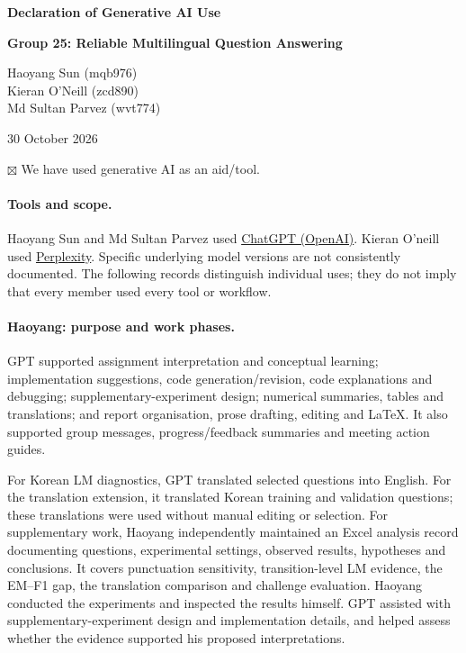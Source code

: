\documentclass[11pt,a4paper]{article}
\begin{document}
\begin{center}
    {\Large\bfseries Declaration of Generative AI Use}

    \vspace{8pt}
    {\bfseries Group 25: Reliable Multilingual Question Answering}

    \vspace{6pt}
    Haoyang Sun (mqb976)\\
    Kieran O'Neill (zcd890)\\
    Md Sultan Parvez (wvt774)

    \vspace{6pt}
    30 October 2026
\end{center}

\vspace{8pt}

$\boxtimes$ We have used generative AI as an aid/tool.

\paragraph{Tools and scope.}
Haoyang Sun and Md Sultan Parvez used
\href{https://chatgpt.com/}{ChatGPT (OpenAI)}.
Kieran O'neill used
\href{https://www.perplexity.ai/}{Perplexity}.
Specific underlying model versions are not consistently documented.
The following records distinguish individual uses; they do not imply
that every member used every tool or workflow.

\paragraph{Haoyang: purpose and work phases.}
GPT supported assignment interpretation and conceptual learning;
implementation suggestions, code generation/revision, code explanations
and debugging; supplementary-experiment design; numerical summaries,
tables and translations; and report organisation, prose drafting,
editing and LaTeX. It also supported group messages, progress/feedback
summaries and meeting action guides.

For Korean LM diagnostics, GPT translated selected questions into
English. For the translation extension, it translated Korean training
and validation questions; these translations were used without manual
editing or selection. For supplementary work, Haoyang independently
maintained an Excel analysis record documenting questions, experimental
settings, observed results, hypotheses and conclusions. It covers
punctuation sensitivity, transition-level LM evidence, the EM--F1 gap,
the translation comparison and challenge evaluation. Haoyang conducted
the experiments and inspected the results himself. GPT assisted with
supplementary-experiment design and implementation details, and helped
assess whether the evidence supported his proposed interpretations.
\end{document}
